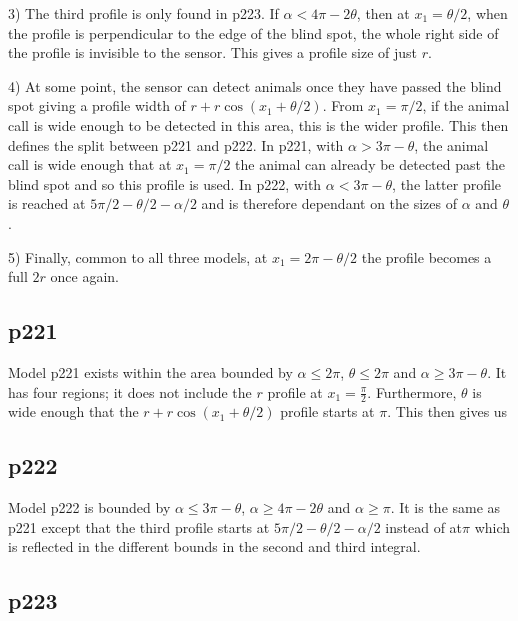 3) The third profile is only found in p223. If $\alpha < 4\pi - 2\theta$, then at $x_1=\theta/2$, when the profile is perpendicular to the edge of the blind spot, the whole right side of the profile is invisible to the sensor. This gives a profile size of just $r$.

4) At some point, the sensor can detect animals once they have passed the blind spot giving a profile width of $r + r\cos(x_1 + \theta/2)$. From $x_1=\pi/2$, if the animal call is wide enough to be detected in this area, this is the wider profile. This then defines the split between p221 and p222. In p221, with $\alpha > 3\pi - \theta$, the animal call is wide enough that at $x_1=\pi/2$ the animal can already be detected past the blind spot and so this profile is used. In p222, with $\alpha < 3\pi - \theta$, the latter profile is reached at $5\pi/2 - \theta/2 - \alpha/2$ and is therefore dependant on the sizes of $\alpha$ and $\theta$. 

5) Finally, common to all three models, at $x_1 = 2\pi - \theta/2$ the profile becomes a full $2r$ once again.


\subsection{p221} \label{p221}

Model p221 exists within the area bounded by $\alpha\le2\pi$, $\theta\le2\pi$ and $\alpha \ge 3\pi - \theta$. It has four regions; it does not include the $r$ profile at $x_1=\frac{\pi}{2}$. Furthermore, $\theta$ is wide enough that the $r + r\cos(x_1 + \theta/2)$ profile starts at $\pi$. This then gives us




\subsection{p222} \label{p222}

Model p222 is bounded by $\alpha \le 3\pi - \theta$, $\alpha \ge 4\pi - 2\theta$ and $\alpha \ge \pi$. It is the same as p221 except that the third profile starts at $5\pi/2 - \theta/2 - \alpha/2$ instead of at$\pi$ which is reflected in the different bounds in the second and third integral.



\subsection{p223} \label{p223}

